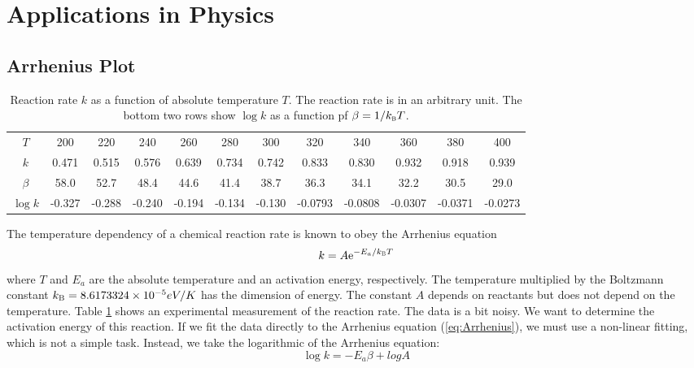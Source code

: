 \noindent
\section{Applications in Physics}

\subsection{Arrhenius Plot}\label{sec:Arrhenius}

\begin{table}
\centering
\caption{Reaction rate $k$ as a function of absolute temperature $T$. The reaction rate is in an arbitrary unit. The bottom two rows show $\log k$ as a function pf $\beta = 1/k_\textsc{b} T$.}
\label{tbl:Arrhenius}
\begin{tabular}{c c c c c c c c c c c c}
\hline
$T$ & 200 &  220 &  240 &  260  & 280 &  300 & 320  & 340  & 360  & 380 &  400 \\
$k$ & 0.471 &    0.515&     0.576&     0.639 &    0.734 &   0.742 &   0.833 &  0.830& 0.932 &0.918&  0.939\\
\hline
$\beta$ & 58.0 &   52.7&    48.4 &   44.6 &   41.4 &   38.7 &   36.3 &   34.1 & 32.2&  30.5&   29.0\\
$\log k$ & -0.327 &  -0.288  & -0.240  & -0.194 &  -0.134 &  -0.130 &  -0.0793  & -0.0808 &-0.0307 &  -0.0371 &  -0.0273 \\
\hline
\end{tabular}

\end{table}
The temperature dependency of a chemical reaction rate is known to obey the Arrhenius equation
\begin{equation}\label{eq:Arrhenius}
k = A \text{e}^{-E_a/k_\textsc{B} T}
\end{equation}
where $T$ and $E_a$ are the absolute temperature and an activation energy, respectively.  The temperature multiplied by the Boltzmann constant $k_\textsc{B}=8.6173324 \times 10^{-5} eV/K$ has the dimension of energy.  The constant $A$ depends on reactants but does not depend on the temperature.
Table \ref{tbl:Arrhenius} shows an experimental measurement of the reaction rate.  The data is a bit noisy.  We want to determine the activation energy of this reaction.  If we fit the data directly to the Arrhenius equation (\ref{eq:Arrhenius}), we must use a non-linear fitting, which is not a simple task. Instead, we take the logarithmic of the Arrhenius equation:
\begin{equation}\label{eq:Arrhenius_log}
\log k = - E_a \beta + log A
\end{equation}
